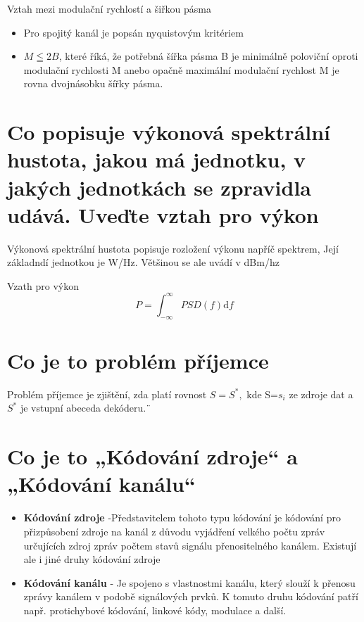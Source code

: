 Vztah mezi modulační rychlostí a šiřkou pásma
\begin{itemize}
    \item Pro spojitý kanál je popsán nyquistovým kritériem
    \item $M \leqq 2B $, které říká, že potřebná šířka pásma B je minimálně poloviční oproti modulační rychlosti M anebo opačně maximální modulační rychlost M je rovna dvojnásobku šířky pásma.
\end{itemize}

\section{Co popisuje výkonová spektrální hustota, jakou má jednotku, v jakých jednotkách se zpravidla udává. Uveďte vztah pro výkon}
 Výkonová spektrální hustota popisuje rozložení výkonu napříč spektrem, Její základndí jednotkou je W/Hz. Většinou se ale uvádí v dBm/hz

Vzath pro výkon
$$P = \int_{-\infty}^{\infty} PSD(f)\mathrm{d}f$$

\section{Co je to problém příjemce}
Problém příjemce je zjištění, zda platí rovnost $S=S^*, $ kde S=${s_i}$ ze zdroje dat a $S^*$ je vstupní abeceda dekóderu.¨

\section{Co je to „Kódování zdroje“ a „Kódování kanálu“ }
\begin{itemize}
    \item \textbf{Kódování zdroje} -Představitelem tohoto typu kódování je kódování pro přizpůsobení zdroje na kanál z důvodu vyjádření velkého počtu zpráv určujících zdroj zpráv počtem stavů signálu přenositelného kanálem. Existují ale i jiné druhy kódování zdroje
    \item \textbf{ Kódování kanálu} - Je spojeno s vlastnostmi kanálu, který slouží k přenosu zprávy kanálem v podobě signálových prvků. K tomuto druhu kódování patří např. protichybové kódování, linkové kódy, modulace a další.
\end{itemize}

